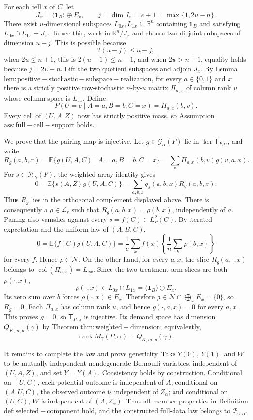 For each cell \(x\) of \(C\), let
\[
J_x=\langle\mathbf 1_B\rangle\oplus E_x,\qquad j=\dim J_x=e+1=\max\{1,2u-n\}.
\]
There exist \(u\)-dimensional subspaces \(L_{0x},L_{1x}\subseteq\mathbb R^n\) containing \(\mathbf 1_B\) and satisfying \(L_{0x}\cap L_{1x}=J_x\). To see this, work in \(\mathbb R^n/J_x\) and choose two disjoint subspaces of dimension \(u-j\). This is possible because
\[
2(u-j)\le n-j;
\]
when \(2u\le n+1\), this is \(2(u-1)\le n-1\), and when \(2u>n+1\), equality holds because \(j=2u-n\). Lift the two quotient subspaces and adjoin \(J_x\). By Lemma \(\mathrm{lem:positive-stochastic-subspace-realization}\), for every \(a\in\{0,1\}\) and \(x\) there is a strictly positive row-stochastic \(n\)-by-\(u\) matrix \(\Pi_{a,x}\) of column rank \(u\) whose column space is \(L_{ax}\). Define
\[
P(U=v\mid A=a,B=b,C=x)=\Pi_{a,x}(b,v).
\]
Every cell of \((U,A,Z)\) now has strictly positive mass, so Assumption \(\mathrm{ass:full-cell-support}\) holds.

We prove that the pairing map is injective. Let \(g\in\mathcal G_\alpha(P)\) lie in \(\ker\mathsf T_{P,\alpha}\), and write
\[
R_g(a,b,x)=\mathbb E\{g(U,A,C)\mid A=a,B=b,C=x\}=\sum_v\Pi_{a,x}(b,v)g(v,a,x).
\]
For \(s\in\mathcal H_\gamma(P)\), the weighted-array identity gives
\[
0=\mathbb E\{s(A,Z)g(U,A,C)\}=\sum_{a,b,x}q_s(a,b,x)R_g(a,b,x).
\]
Thus \(R_g\) lies in the orthogonal complement displayed above. There is consequently a \(\rho\in\mathcal L_r\) such that \(R_g(a,b,x)=\rho(b,x)\), independently of \(a\). Pairing also vanishes against every \(s=f(C)\in L_P^2(C)\). By iterated expectation and the uniform law of \((A,B,C)\),
\[
0=\mathbb E\{f(C)g(U,A,C)\}=\frac1c\sum_x f(x)\left\{\frac1n\sum_b\rho(b,x)\right\}
\]
for every \(f\). Hence \(\rho\in\mathcal N\). On the other hand, for every \(a,x\), the slice \(R_g(a,\cdot,x)\) belongs to \(\operatorname{col}(\Pi_{a,x})=L_{ax}\). Since the two treatment-arm slices are both \(\rho(\cdot,x)\),
\[
\rho(\cdot,x)\in L_{0x}\cap L_{1x}=\langle\mathbf1_B\rangle\oplus E_x.
\]
Its zero sum over \(b\) forces \(\rho(\cdot,x)\in E_x\). Therefore \(\rho\in\mathcal N\cap\bigoplus_xE_x=\{0\}\), so \(R_g=0\). Each \(\Pi_{a,x}\) has column rank \(u\), and hence \(g(\cdot,a,x)=0\) for every \(a,x\). This proves \(g=0\), so \(\mathsf T_{P,\alpha}\) is injective. Its demand space has dimension \(Q_{K,m,u}(\gamma)\) by Theorem \(\mathrm{thm:weighted-dimension}\); equivalently,
\[
\operatorname{rank}M_\gamma(P,\alpha)=Q_{K,m,u}(\gamma).
\]

It remains to complete the law and prove genericity. Take \(Y(0)\), \(Y(1)\), and \(W\) to be mutually independent nondegenerate Bernoulli variables, independent of \((U,A,Z)\), and set \(Y=Y(A)\). Consistency holds by construction. Conditional on \((U,C)\), each potential outcome is independent of \(A\); conditional on \((A,U,C)\), the observed outcome is independent of \(Z_\alpha\); and conditional on \((U,C)\), \(W\) is independent of \((A,Z_\alpha)\). Thus all member properties in Definition \(\mathrm{def:selected-component}\) hold, and the constructed full-data law belongs to \(\mathcal P_{\gamma,\alpha}\).

